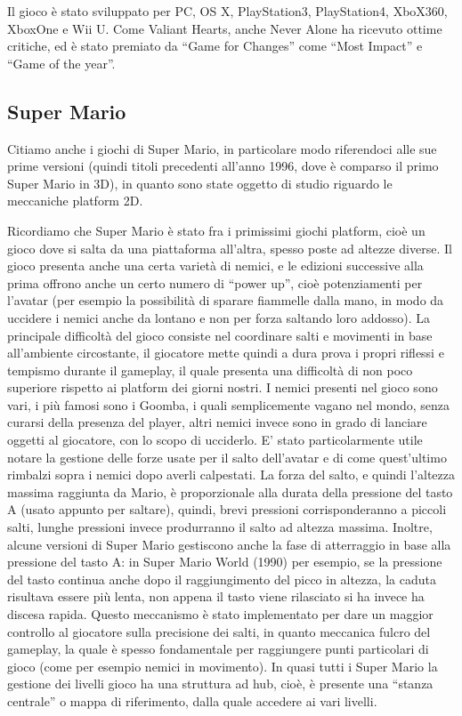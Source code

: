 Il gioco è stato sviluppato per PC, OS X, PlayStation3, PlayStation4, XboX360, XboxOne e Wii U. Come Valiant Hearts, anche Never Alone ha ricevuto ottime critiche, ed è stato premiato da ``Game for Changes'' come ``Most Impact'' e ``Game of the year''.



\subsection{Super Mario}

Citiamo anche i giochi di Super Mario, in particolare modo riferendoci alle sue prime versioni (quindi titoli precedenti all'anno 1996, dove è comparso il primo Super Mario in 3D), in quanto sono state oggetto di studio riguardo le meccaniche platform 2D.

Ricordiamo che Super Mario è stato fra i primissimi giochi platform, cioè un gioco dove si salta da una piattaforma all'altra, spesso poste ad altezze diverse. Il gioco presenta anche una certa varietà di nemici, e le edizioni successive alla prima offrono anche un certo numero di ``power up'', cioè potenziamenti per l'avatar (per esempio la possibilità di sparare fiammelle dalla mano, in modo da uccidere i nemici anche da lontano e non per forza saltando loro addosso).
La principale difficoltà del gioco consiste nel coordinare salti e movimenti in base all'ambiente circostante, il giocatore mette quindi a dura prova i propri riflessi e tempismo durante il gameplay, il quale presenta una difficoltà di non poco superiore rispetto ai platform dei giorni nostri. I nemici presenti nel gioco sono vari, i più famosi sono i Goomba, i quali semplicemente vagano nel mondo, senza curarsi della presenza del player, altri nemici invece sono in grado di lanciare oggetti al giocatore, con lo scopo di ucciderlo.
E' stato particolarmente utile notare la gestione delle forze usate per il salto dell'avatar e di come quest'ultimo rimbalzi sopra i nemici dopo averli calpestati. La forza del salto, e quindi l'altezza massima raggiunta da Mario, è proporzionale alla durata della pressione del tasto A (usato appunto per saltare), quindi, brevi pressioni corrisponderanno a piccoli salti, lunghe pressioni invece produrranno il salto ad altezza massima. Inoltre, alcune versioni di Super Mario gestiscono anche la fase di atterraggio in base alla pressione del tasto A: in Super Mario World (1990)  per esempio, se la pressione del tasto continua anche dopo il raggiungimento del picco in altezza, la caduta risultava essere più lenta, non appena il tasto viene rilasciato si ha invece ha discesa rapida. Questo meccanismo è stato implementato per dare un maggior controllo al giocatore sulla precisione dei salti, in quanto meccanica fulcro del gameplay, la quale è spesso fondamentale per raggiungere punti particolari di gioco (come per esempio nemici in movimento).
In quasi tutti i Super Mario la gestione dei livelli gioco ha una struttura ad hub, cioè, è presente una ``stanza centrale'' o mappa di riferimento, dalla quale accedere ai vari livelli.

